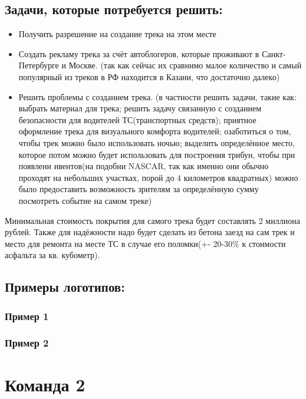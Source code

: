 \documentclass[a4paper, 12pt]{article}
\begin{document}
	\subsection*{Задачи, которые потребуется решить:}
	\begin{itemize}
		\item Получить разрешение на создание трека на этом месте
		\item Создать рекламу трека за счёт автоблогеров, которые проживают в Санкт-Петербурге и Москве. (так как сейчас их сравнимо малое количество и самый популярный из треков в РФ находится в Казани, что достаточно далеко)
		\item Решить проблемы с созданием трека. (в частности решить задачи, такие как: выбрать материал для трека; решить задачу связанную с созданием безопасности для водителей ТС(транспортных средств); приятное оформление трека для визуального комфорта водителей; озаботиться о том, чтобы трек можно было использовать ночью; выделить определённое место, которое потом можно будет использовать для построения трибун, чтобы при появлени ивентов(на подобии NASCAR, так как именно они обычно проходят на небольших участках, порой до 4 километров квадратных) можно было предоставить возможность зрителям за определённую сумму посмотреть событие на самом треке)
	\end{itemize}

	Минимальная стоимость покрытия для самого трека будет составлять 2 миллиона рублей. Также для надёжности надо будет сделать из бетона заезд на сам трек и место для ремонта на месте ТС в случае его поломки(+- 20-30\% к стоимости асфальта за кв. кубометр).

	\subsection*{Примеры логотипов:}
	\subsubsection*{Пример 1}
	\subsubsection*{Пример 2}
	
	
	\section*{Команда 2}
	
\end{document}
